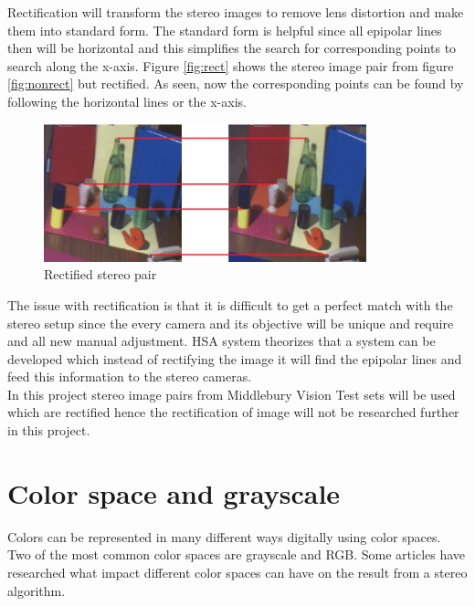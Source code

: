 Rectification will transform the stereo images to remove lens distortion and make them into standard form. The standard form is helpful since all epipolar lines then will be horizontal and this simplifies the search for corresponding points to search along the x-axis. Figure \vref{fig:rect} shows the stereo image pair from figure \vref{fig:nonrect} but rectified. As seen, now the corresponding points can be found by following the horizontal lines or the x-axis.\\

\begin{figure}[ht!]
  \centering
  \includegraphics[height=4cm]{figures/rect}
  \caption{Rectified stereo pair\label{fig:rect} \cite{Mattoccia2013}}
\end{figure}

The issue with rectification is that it is difficult to get a perfect match with the stereo setup since the every camera and its objective will be unique and require and all new manual adjustment. HSA system theorizes that a system can be developed which instead of rectifying the image it will find the epipolar lines and feed this information to the stereo cameras.\\

In this project stereo image pairs from Middlebury Vision Test sets \cite{middlebury2016} will be used which are rectified hence the rectification of image will not be researched further in this project.

\section{Color space and grayscale}
Colors can be represented in many different ways digitally using color spaces. Two of the most common color spaces are grayscale and RGB. Some articles have researched what impact different color spaces can have on the result from a stereo algorithm.\\ 

